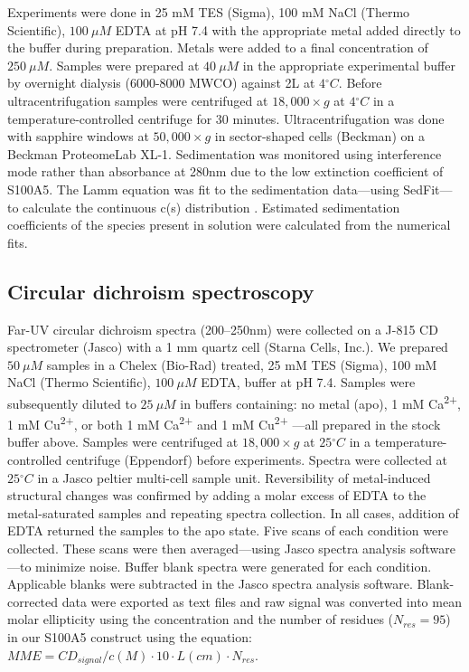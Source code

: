Experiments were done in 25 mM TES (Sigma), 100 mM NaCl (Thermo Scientific),
$100\ \mu M$ EDTA at pH 7.4 with the appropriate metal added directly
to the buffer during preparation. Metals were added to a final concentration
of $250\ \mu M$. Samples were prepared at $40\ \mu M$ in the appropriate
experimental buffer by overnight dialysis (6000-8000 MWCO) against
2L at $4{^\circ}C$. Before ultracentrifugation samples were centrifuged
at $18,000 \times g$ at $4{^\circ}C$ in a temperature-controlled centrifuge
for 30 minutes. Ultracentrifugation was done with sapphire windows
at $50,000 \times g$ in sector-shaped cells (Beckman) on a Beckman ProteomeLab
XL-1. Sedimentation was monitored using interference mode rather than
absorbance at 280nm due to the low extinction coefficient of S100A5.
The Lamm equation was fit to the sedimentation data---using SedFit---to
calculate the continuous c(s) distribution \cite{schuck_size-distribution_2000,brown_macromolecular_2006}.
Estimated sedimentation coefficients of the species present in solution
were calculated from the numerical fits.

\subsection{Circular dichroism spectroscopy}

Far-UV circular dichroism spectra (200–250nm) were collected on a
J-815 CD spectrometer (Jasco) with a 1 mm quartz cell (Starna Cells,
Inc.). We prepared $50\ \mu M$ samples in a Chelex (Bio-Rad) treated,
25 mM TES (Sigma), 100 mM NaCl (Thermo Scientific), $100\ \mu M$ EDTA,
buffer at pH 7.4. Samples were subsequently diluted to $25\ \mu M$
in buffers containing: no metal (apo), 1 mM Ca\textsuperscript{2+},
1 mM Cu\textsuperscript{2+}, or both 1 mM Ca\textsuperscript{2+} and
1 mM Cu\textsuperscript{2+} ---all prepared in the stock buffer above.
Samples were centrifuged at $18,000 \times g$ at $25{^\circ}C$ in a temperature-controlled
centrifuge (Eppendorf) before experiments. Spectra were collected
at $25{^\circ}C$ in a Jasco peltier multi-cell sample unit. Reversibility
of metal-induced structural changes was confirmed by adding a molar
excess of EDTA to the metal-saturated samples and repeating spectra
collection. In all cases, addition of EDTA returned the samples to
the apo state. Five scans of each condition were collected. These
scans were then averaged---using Jasco spectra analysis software---to
minimize noise. Buffer blank spectra were generated for each condition.
Applicable blanks were subtracted in the Jasco spectra analysis software.
Blank-corrected data were exported as text files and raw signal was
converted into mean molar ellipticity using the concentration and
the number of residues ($N_{res}=95$) in our S100A5 construct using
the equation: $MME=CD_{signal}/c(M)\cdot10\cdot L(cm)\cdot N_{res}$.

